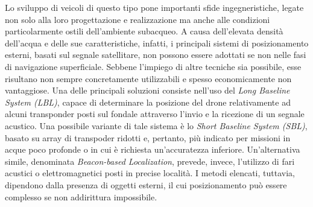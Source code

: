 Lo sviluppo di veicoli di questo tipo pone importanti sfide ingegneristiche, legate non solo alla loro progettazione e realizzazione ma anche alle condizioni particolarmente ostili dell'ambiente subacqueo. A causa dell'elevata densità dell'acqua e delle sue caratteristiche, infatti, i principali sistemi di posizionamento esterni, basati sul segnale satellitare, non possono essere adottati se non nelle fasi di navigazione superficiale. Sebbene l'impiego di altre tecniche sia possibile, esse risultano non sempre concretamente utilizzabili e spesso economicamente non vantaggiose. Una delle principali soluzioni consiste nell'uso del \emph{Long Baseline System (LBL)}, capace di determinare la posizione del drone relativamente ad alcuni transponder posti sul fondale attraverso l'invio e la ricezione di un segnale acustico. Una possibile variante di tale sistema è lo \emph{Short Baseline System (SBL)}, basato su array di transpoder ridotti e, pertanto, più indicato per missioni in acque poco profonde o in cui è richiesta un'accuratezza inferiore. Un'alternativa simile, denominata \emph{Beacon-based Localization}, prevede, invece, l'utilizzo di fari acustici o elettromagnetici posti in precise località. I metodi elencati, tuttavia, dipendono dalla presenza di oggetti esterni, il cui posizionamento può essere complesso se non addirittura impossibile. 

